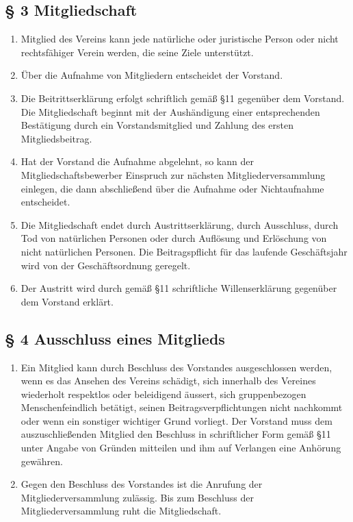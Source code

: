 \documentclass[10pt,a4paper]{scrartcl}
\begin{document}
\subsection*{§ 3 Mitgliedschaft}
\begin{enumerate}
	\item Mitglied des Vereins kann jede natürliche oder juristische Person oder
		nicht rechts\-fähiger Verein werden, die seine Ziele unterstützt.
	\item Über die Aufnahme von Mitgliedern entscheidet der Vorstand.
	\item Die Beitrittserklärung erfolgt schriftlich gemäß §11 gegenüber dem Vorstand. Die
		Mitgliedschaft beginnt mit der Aushändigung einer entsprechenden Bestätigung durch
		ein Vorstandsmitglied und Zahlung des ersten Mitgliedsbeitrag.
	\item Hat der Vorstand die Aufnahme abgelehnt, so kann der Mitgliedschaftsbewerber Einspruch
		zur nächsten Mitgliederversammlung einlegen, die dann abschließend über die Aufnahme
		oder Nichtaufnahme entscheidet.
	\item Die Mitgliedschaft endet durch Austrittserklärung, durch Ausschluss, durch Tod von
		natür\-li\-chen Personen oder durch Auflösung und Erlöschung von nicht
		natür\-lichen Personen.
		Die Beitragspflicht für das laufende Geschäftsjahr wird von der Geschäftsordnung
		geregelt.
	\item Der Austritt wird durch gemäß §11 schriftliche Willenserklärung gegenüber dem Vorstand
		erklärt.
\end{enumerate}
\subsection*{§ 4 Ausschluss eines Mitglieds }
\begin{enumerate}
	\item Ein Mitglied kann durch Beschluss des Vorstandes ausgeschlossen werden, wenn es das
		Ansehen des Vereins schädigt, sich innerhalb des Vereines wiederholt respektlos oder beleidigend äussert, sich gruppenbezogen Menschenfeindlich betätigt, seinen Beitragsverpflichtungen nicht nachkommt oder
		wenn ein sonstiger wichtiger Grund vorliegt. Der Vorstand muss dem auszuschließenden
		Mitglied den Beschluss in schriftlicher Form gemäß §11 unter Angabe von Gründen
		mitteilen und ihm auf Verlangen eine Anhörung gewähren.
	\item Gegen den Beschluss des Vorstandes ist die Anrufung der Mitgliederversammlung
		zu\-läs\-sig. Bis zum Beschluss der Mitgliederversammlung ruht die Mitgliedschaft.
	
\end{enumerate}
\end{document}
